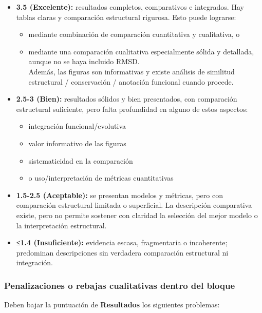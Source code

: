 \documentclass[
  11pt,
  a4paper,
  twoside]{scrreprt}
\providecommand{\tightlist}{%
  \setlength{\itemsep}{0pt}\setlength{\parskip}{0pt}}
\begin{document}
\begin{itemize}
\item
  \textbf{3.5 (Excelente):} resultados completos, comparativos e
  integrados. Hay tablas claras y comparación estructural rigurosa. Esto
  puede lograrse:

  \begin{itemize}
  \tightlist
  \item
    mediante combinación de comparación cuantitativa y cualitativa, o
  \item
    mediante una comparación cualitativa especialmente sólida y
    detallada, aunque no se haya incluido RMSD.\\
    Además, las figuras son informativas y existe análisis de similitud
    estructural / conservación / anotación funcional cuando procede.
  \end{itemize}
\item
  \textbf{2.5-3 (Bien):} resultados sólidos y bien presentados, con
  comparación estructural suficiente, pero falta profundidad en alguno
  de estos aspectos:

  \begin{itemize}
  \tightlist
  \item
    integración funcional/evolutiva
  \item
    valor informativo de las figuras
  \item
    sistematicidad en la comparación
  \item
    o uso/interpretación de métricas cuantitativas
  \end{itemize}
\item
  \textbf{1.5-2.5 (Aceptable):} se presentan modelos y métricas, pero
  con comparación estructural limitada o superficial. La descripción
  comparativa existe, pero no permite sostener con claridad la selección
  del mejor modelo o la interpretación estructural.
\item
  \textbf{≤1.4 (Insuficiente):} evidencia escasa, fragmentaria o
  incoherente; predominan descripciones sin verdadera comparación
  estructural ni integración.
\end{itemize}

\subsubsection{Penalizaciones o rebajas cualitativas dentro del
bloque}\label{penalizaciones-o-rebajas-cualitativas-dentro-del-bloque}

Deben bajar la puntuación de \textbf{Resultados} los siguientes
problemas:
\end{document}
